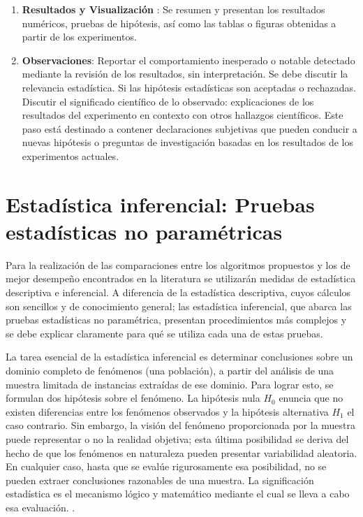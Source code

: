 \begin{enumerate}
	\item \textbf{Resultados y Visualización }: Se resumen y presentan los resultados numéricos, pruebas de hipótesis, así como las tablas o figuras obtenidas a partir de los experimentos.
	\item \textbf{Observaciones}: Reportar el comportamiento inesperado o notable detectado mediante la revisión de los resultados, sin interpretación. Se debe discutir la relevancia estadística. Si las hipótesis estadísticas son aceptadas o rechazadas. Discutir el significado científico de lo observado: explicaciones de los resultados del experimento en contexto con otros hallazgos científicos. Este paso está destinado a contener declaraciones subjetivas que pueden conducir a nuevas hipótesis o preguntas de investigación basadas en los resultados de los experimentos actuales.
\end{enumerate}

\section{Estadística inferencial: Pruebas estadísticas no paramétricas}
Para la realización de las comparaciones entre los algoritmos propuestos y los de mejor desempeño encontrados en la literatura se utilizarán medidas de estadística  descriptiva e inferencial. A diferencia de la estadística descriptiva, cuyos cálculos son sencillos y de conocimiento general; las estadística inferencial, que abarca las pruebas estadísticas no paramétrica, presentan procedimientos más complejos y se debe explicar claramente para qué se utiliza cada una de estas pruebas.

La tarea esencial de la estadística inferencial es determinar conclusiones sobre un dominio completo de fenómenos (una población), a partir del análisis de una muestra limitada de instancias extraídas de ese dominio. Para lograr esto, se formulan dos hipótesis sobre el fenómeno. La hipótesis nula $H_0$ enuncia que no existen diferencias entre los fenómenos observados y la hipótesis alternativa $H_1$  el caso contrario. Sin embargo, la visión del fenómeno proporcionada por la muestra puede representar o no la realidad objetiva; esta última posibilidad se deriva del hecho de que los fenómenos en naturaleza pueden presentar variabilidad aleatoria. En cualquier caso, hasta que se evalúe rigurosamente esa posibilidad, no se pueden extraer conclusiones razonables de una muestra. La significación estadística es el mecanismo lógico y matemático mediante el cual se lleva a cabo esa evaluación. \cite{Lowry2004}.

